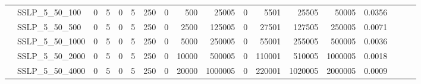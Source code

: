 \begin{landscape}
\begin{longtable}[c]{llrrrrrrrrrrrrrlll}
		& SSLP\_5\_50\_100             & 0                           & 5                          & 0                          & 5                           & 250                        & 0                          & 500                        & 25005                     & 0                         & 5501                       & 25505                      & 50005                          & 0.0356                        &                          &                          &                          \\
		& SSLP\_5\_50\_500             & 0                           & 5                          & 0                          & 5                           & 250                        & 0                          & 2500                       & 125005                    & 0                         & 27501                      & 127505                     & 250005                         & 0.0071                        &                          &                          &                          \\
		& SSLP\_5\_50\_1000            & 0                           & 5                          & 0                          & 5                           & 250                        & 0                          & 5000                       & 250005                    & 0                         & 55001                      & 255005                     & 500005                         & 0.0036                        &                          &                          &                          \\
		& SSLP\_5\_50\_2000            & 0                           & 5                          & 0                          & 5                           & 250                        & 0                          & 10000                      & 500005                    & 0                         & 110001                     & 510005                     & 1000005                        & 0.0018                        &                          &                          &                          \\
		& SSLP\_5\_50\_4000            & 0                           & 5                          & 0                          & 5                           & 250                        & 0                          & 20000                      & 1000005                   & 0                         & 220001                     & 1020005                    & 2000005                        & 0.0009                        &                          &                          &                          \\

\end{longtable}
\end{landscape}
